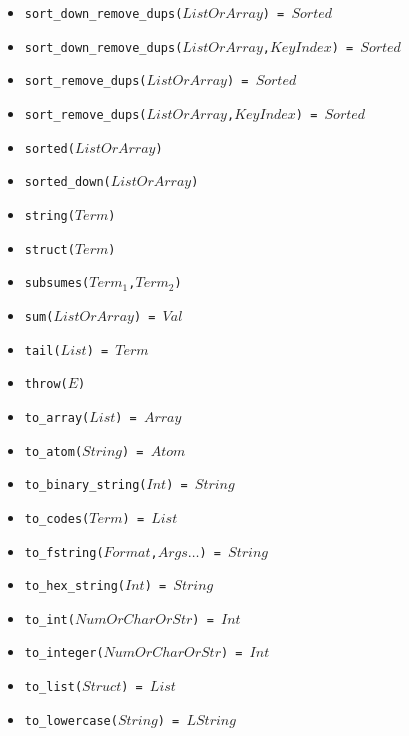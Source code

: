 \documentclass[10pt]{article}
\begin{document}
\begin{multicols}{2}
\begin{scriptsize}
\begin{itemize}
    \item \texttt{sort\_down\_remove\_dups($ListOrArray$) = $Sorted$} 
    \item \texttt{sort\_down\_remove\_dups($ListOrArray$,$KeyIndex$) = $Sorted$} 
    \item \texttt{sort\_remove\_dups($ListOrArray$) = $Sorted$} 
    \item \texttt{sort\_remove\_dups($ListOrArray$,$KeyIndex$) = $Sorted$} 
    \item \texttt{sorted($ListOrArray$)} 
    \item \texttt{sorted\_down($ListOrArray$)} 
    \item \texttt{string($Term$)} 
    \item \texttt{struct($Term$)} 
    \item \texttt{subsumes($Term_1$,$Term_2$)}
    \item \texttt{sum($ListOrArray$) = $Val$}
    \item \texttt{tail($List$) = $Term$} 
    \item \texttt{throw($E$)}    
    \item \texttt{to\_array($List$) = $Array$} 
    \item \texttt{to\_atom($String$) = $Atom$} 
    \item \texttt{to\_binary\_string($Int$) = $String$}
    \item \texttt{to\_codes($Term$) = $List$}        
    \item \texttt{to\_fstring($Format$,$Args\ldots$) = $String$}
    \item \texttt{to\_hex\_string($Int$) = $String$}    
    \item \texttt{to\_int($NumOrCharOrStr$) = $Int$} 
    \item \texttt{to\_integer($NumOrCharOrStr$) = $Int$} 
    \item \texttt{to\_list($Struct$) = $List$} 
    \item \texttt{to\_lowercase($String$) = $LString$}

\end{itemize}
\end{scriptsize}
\end{multicols}
\end{document}
